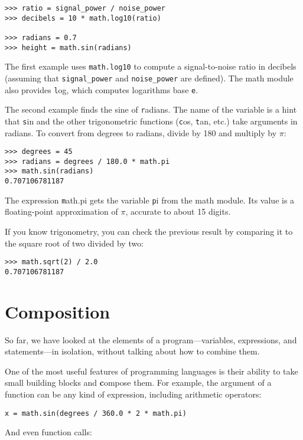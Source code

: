 \documentclass[
DIV=11,
fontsize=12,
twoside,
headinclude=false,
titlepage=firstiscover,
abstract=true,
headsepline=true,
footsepline=true,
chapterprefix=true, %
headings=big,
bibliography=totoc,%
captions=tableheading
]{scrbook}
\theoremstyle{definition}
\begin{document}
\begin{lstlisting}
>>> ratio = signal_power / noise_power
>>> decibels = 10 * math.log10(ratio)

>>> radians = 0.7
>>> height = math.sin(radians)
\end{lstlisting}
%
The first example uses \verb"math.log10" to compute 
a signal-to-noise ratio in decibels (assuming that \verb"signal_power" and
\verb"noise_power" are defined).  The math module also provides {\texttt log},
which computes logarithms base {\texttt e}.

The second example finds the sine of {\texttt radians}.  The name of the
variable is a hint that {\texttt sin} and the other trigonometric
functions ({\texttt cos}, {\texttt tan}, etc.)  take arguments in radians. To
convert from degrees to radians, divide by 180 and multiply by
$\pi$:

\begin{lstlisting}
>>> degrees = 45
>>> radians = degrees / 180.0 * math.pi
>>> math.sin(radians)
0.707106781187
\end{lstlisting}
%
The expression {\texttt math.pi} gets the variable {\texttt pi} from the math
module.  Its value is a floating-point approximation
of $\pi$, accurate to about 15 digits.

If you know
trigonometry, you can check the previous result by comparing it to
the square root of two divided by two:

\begin{lstlisting}
>>> math.sqrt(2) / 2.0
0.707106781187
\end{lstlisting}
%

\section{Composition}

So far, we have looked at the elements of a program---variables,
expressions, and statements---in isolation, without talking about how to
combine them.

One of the most useful features of programming languages is their
ability to take small building blocks and {\textbf compose} them.  For
example, the argument of a function can be any kind of expression,
including arithmetic operators:

\begin{lstlisting}
x = math.sin(degrees / 360.0 * 2 * math.pi)
\end{lstlisting}
%
And even function calls:
\end{document}

